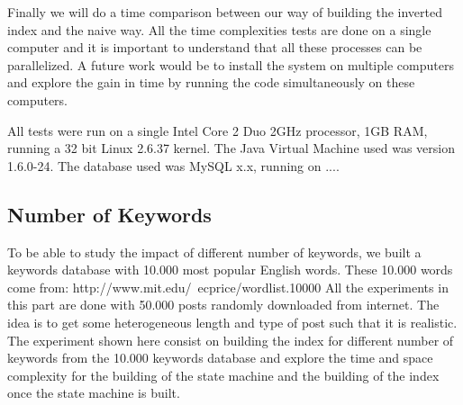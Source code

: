 \documentclass[10pt]{report}
\begin{document}
Finally we will do a time comparison between our way of building the
inverted index and the naive way.  All the time complexities tests are
done on a single computer and it is important to understand that all
these processes can be parallelized. A future work would be to install
the system on multiple computers and explore the gain in time by
running the code simultaneously on these computers.


All tests were run on a single Intel Core 2 Duo 2GHz
processor, 1GB RAM, running a 32 bit Linux 2.6.37 kernel. The Java
Virtual Machine used was version 1.6.0-24. The database used was MySQL
x.x, running on ....




\subsection{Number of Keywords}
To be able to study the impact of different number of keywords, we
built a keywords database with 10.000 most popular English
words. These 10.000 words come from:
http://www.mit.edu/~ecprice/wordlist.10000 All the experiments in this
part are done with 50.000 posts randomly downloaded from internet. The
idea is to get some heterogeneous length and type of post such that it
is realistic.  The experiment shown here consist on building the index
for different number of keywords from the 10.000 keywords database and
explore the time and space complexity for the building of the state
machine and the building of the index once the state machine is built.
\end{document}

